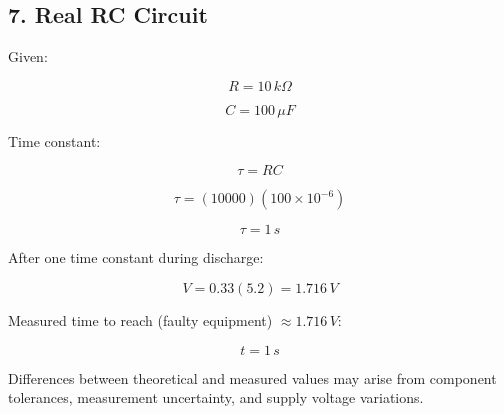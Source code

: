 \documentclass[11pt]{article}
\begin{document}
\subsection*{7. Real RC Circuit}

Given:

\[
R = 10\,k\Omega
\]

\[
C = 100\,\mu F
\]

Time constant:

\[
\tau = RC
\]

\[
\tau = (10000)(100\times10^{-6})
\]

\[
\tau = 1\,s
\]

After one time constant during discharge:

\[
V = 0.33(5.2) = 1.716\,V
\]

Measured time to reach (faulty equipment) $\approx1.716\,V$:

\[
t = 1\,s
\]

Differences between theoretical and measured values may arise from component tolerances, measurement uncertainty, and supply voltage variations.
\end{document}
